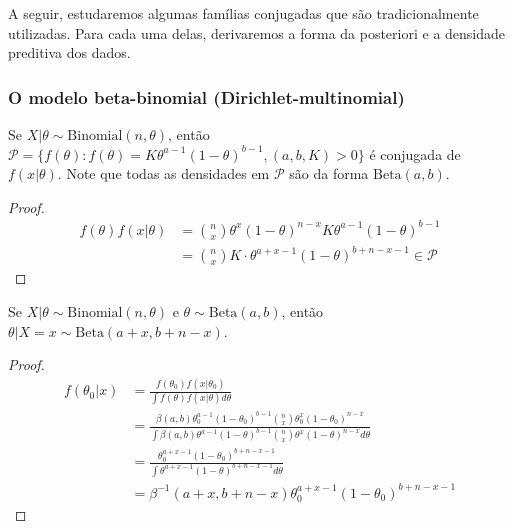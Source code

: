 A seguir, estudaremos algumas famílias conjugadas que
são tradicionalmente utilizadas.
Para cada uma delas, derivaremos a forma da posteriori e
a densidade preditiva dos dados.

\subsubsection{O modelo beta-binomial (Dirichlet-multinomial)}
\label{sec:conjugate_beta_binomial}

\begin{lemma}
 \label{lemma:beta-binomial-1}
 Se $X|\theta \sim \text{Binomial}(n,\theta)$, então
 $\mathcal{P} = \{f(\theta): f(\theta) = K \theta^{a-1}(1-\theta)^{b-1}, (a,b,K) > 0\}$
 é conjugada de $f(x|\theta)$.
 Note que todas as densidades em $\mathcal{P}$ são
 da forma $\text{Beta}(a,b)$.
\end{lemma}

\begin{proof}
 \begin{align*}
  f(\theta)f(x|\theta)
  &= {n \choose x}\theta^{x}(1-\theta)^{n-x}
  K \theta^{a-1}(1-\theta)^{b-1} \\
  &= {n \choose x}K \cdot \theta^{a+x-1}
  (1-\theta)^{b+n-x-1} \in \mathcal{P}
 \end{align*}
\end{proof}

\begin{lemma}
 \label{lemma:beta-binomial-2}
 Se $X|\theta \sim \text{Binomial}(n,\theta)$ e
 $\theta \sim \text{Beta}(a,b)$, então
 $\theta|X=x \sim \text{Beta}(a+x,b+n-x)$.
\end{lemma}

\begin{proof}
 \begin{align*}
  f(\theta_{0}|x)
  &= \frac{f(\theta_{0})f(x|\theta_{0})}
  {\int{f(\theta)f(x|\theta)d\theta}} \\
  &= \frac{\beta(a,b)\theta_{0}^{a-1}(1-\theta_{0})^{b-1}
  {n \choose x}\theta_{0}^{x}(1-\theta_{0})^{n-x}}
  {\int{\beta(a,b)\theta^{a-1}(1-\theta)^{b-1}
  {n \choose x}\theta^{x}(1-\theta)^{n-x}d\theta}} \\
  &= \frac{\theta_{0}^{a+x-1}(1-\theta_{0})^{b+n-x-1}}
  {\int{\theta^{a+x-1}(1-\theta)^{b+n-x-1}d\theta}}	\\
  &= \beta^{-1}(a+x,b+n-x)\theta_{0}^{a+x-1}
  (1-\theta_{0})^{b+n-x-1}
 \end{align*}
\end{proof}

